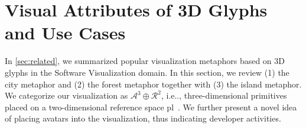 \documentclass[runningheads]{llncs}
\makeatletter
\DeclareRobustCommand\onedot{\futurelet\@let@token\@onedot}
\def\@onedot{\ifx\@let@token.\else.\null\fi\xspace}
\def\ie{i.e\onedot,\xspace}
\makeatother
\begin{document}
\section{Visual Attributes of 3D Glyphs and Use Cases}
\label{sec:conceptvisualization}
In \autoref{sec:related}, we summarized popular visualization metaphors based on 3D glyphs in the Software Visualization domain.
In this section, we review (1) the city metaphor and (2) the forest metaphor together with (3) the island metaphor.
We categorize our visualization as $\mathcal{A}^3 \oplus \mathcal{R}^2$, \ie three-dimensional primitives placed on a two-dimensional reference space pl~\cite{atzberger2021softwareforest,duebel2014-2d3drepresentation}.
We further present a novel idea of placing avatars into the visualization, thus indicating developer activities.
\end{document}
